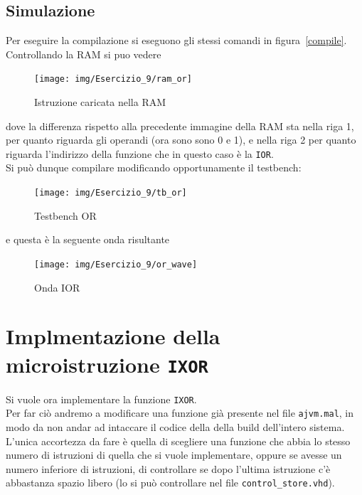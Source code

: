 
\subsection{Simulazione}
Per eseguire la compilazione si eseguono gli stessi comandi in figura~\ref{compile}.\\
Controllando la RAM  si puo vedere
\begin{figure}[H]
	\centering
	\texttt{[image: img/Esercizio\_9/ram\_or]}
	\caption{Istruzione caricata nella RAM}
	\label{ram_or}
\end{figure}
dove la differenza rispetto alla precedente immagine della RAM sta nella riga 1, per quanto riguarda gli operandi (ora sono sono 0 e 1), e nella riga 2 per quanto riguarda l'indirizzo della funzione che in questo caso è la \texttt{IOR}.\\
Si può dunque compilare modificando opportunamente il testbench:
\begin{figure}[H]
	\centering
	\texttt{[image: img/Esercizio\_9/tb\_or]}
	\caption{Testbench OR}
	\label{tb_or}
\end{figure}
e questa è la seguente onda risultante
\begin{figure}[H]
	\centering
	\texttt{[image: img/Esercizio\_9/or\_wave]}
	\caption{Onda IOR}
	\label{or_wave}
\end{figure}


\section{Implmentazione della microistruzione \texttt{IXOR}}
Si vuole ora implementare la funzione \texttt{IXOR}.\\
Per far ciò andremo a modificare una funzione già presente nel file \texttt{ajvm.mal}, in modo da non andar ad intaccare il codice della della build dell'intero sistema.\\
L'unica accortezza da fare è quella di scegliere una funzione che abbia lo stesso numero di istruzioni di quella che si vuole implementare, oppure se avesse un numero inferiore di istruzioni, di controllare se dopo l'ultima istruzione c'è abbastanza spazio libero (lo si può controllare nel file \texttt{control\_store.vhd}).\\

